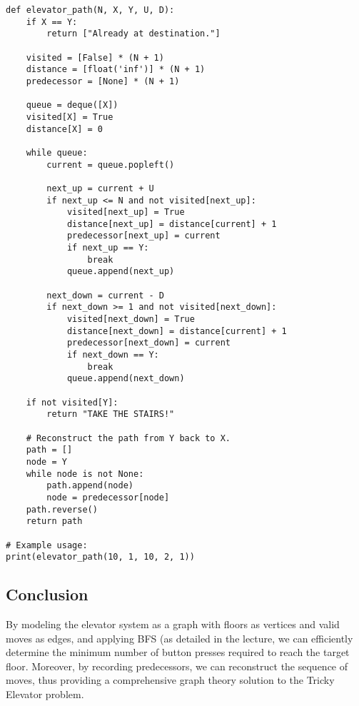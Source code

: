 \documentclass[12pt]{article}
\begin{document}
\begin{lstlisting}
def elevator_path(N, X, Y, U, D):
    if X == Y:
        return ["Already at destination."]
    
    visited = [False] * (N + 1)
    distance = [float('inf')] * (N + 1)
    predecessor = [None] * (N + 1)
    
    queue = deque([X])
    visited[X] = True
    distance[X] = 0
    
    while queue:
        current = queue.popleft()
        
        next_up = current + U
        if next_up <= N and not visited[next_up]:
            visited[next_up] = True
            distance[next_up] = distance[current] + 1
            predecessor[next_up] = current
            if next_up == Y:
                break
            queue.append(next_up)
        
        next_down = current - D
        if next_down >= 1 and not visited[next_down]:
            visited[next_down] = True
            distance[next_down] = distance[current] + 1
            predecessor[next_down] = current
            if next_down == Y:
                break
            queue.append(next_down)
    
    if not visited[Y]:
        return "TAKE THE STAIRS!"
    
    # Reconstruct the path from Y back to X.
    path = []
    node = Y
    while node is not None:
        path.append(node)
        node = predecessor[node]
    path.reverse()
    return path

# Example usage:
print(elevator_path(10, 1, 10, 2, 1))
\end{lstlisting}

\subsection*{Conclusion}
By modeling the elevator system as a graph with floors as vertices and valid moves as edges, and applying BFS (as detailed in the lecture, we can efficiently determine the minimum number of button presses required to reach the target floor. Moreover, by recording predecessors, we can reconstruct the sequence of moves, thus providing a comprehensive graph theory solution to the Tricky Elevator problem.
\end{document}
